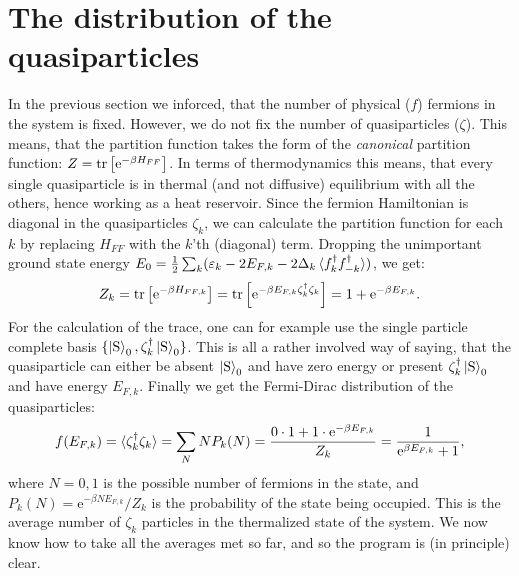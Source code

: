 \section{The distribution of the quasiparticles}
In the previous section we inforced, that the number of physical ($f$) fermions in the system is fixed. However, we do not fix the number of quasiparticles ($\zeta$). This means, that the partition function takes the form of the \textit{canonical} partition function: $Z = \operatorname{tr}\left[\text{e}^{-\beta H_{FF}}\right]$. In terms of thermodynamics this means, that every single quasiparticle is in thermal (and not diffusive) equilibrium with all the others, hence working as a heat reservoir. Since the fermion Hamiltonian is diagonal in the quasiparticles $\zeta_k$, we can calculate the partition function for each $k$ by replacing $H_{FF}$ with the $k$'th (diagonal) term. Dropping the unimportant ground state energy $E_0 = \frac{1}{2}\sum_k (\varepsilon_k-2E_{F,k}-2\Delta_k\braket {f^\dagger_k f^\dagger_{-k}})$, we get:
\begin{equation}
Z_k = \operatorname{tr}\left[\text{e}^{-\beta H_{FF,k}}\right] = \operatorname{tr}\left[\text{e}^{-\beta E_{F,k}\zeta^\dagger_k\zeta_k }\right] = 1 + \text{e}^{-\beta E_{F,k}}. 
\end{equation}     
For the calculation of the trace, one can for example use the single particle complete basis $\{\ket{\text{S}}_0, \zeta^\dagger_k\ket{\text{S}}_0\}$. This is all a rather involved way of saying, that the quasiparticle can either be absent $\ket{\text{S}}_0$ and have zero energy or present $\zeta^\dagger_k\ket{\text{S}}_0$ and have energy $E_{F,k}$. Finally we get the Fermi-Dirac distribution of the quasiparticles:
\begin{equation}
f(E_{F,k}) = \braket {\zeta^\dagger_k\zeta_k} = \sum_N N P_k(N) = \frac{0\cdot 1 + 1 \cdot \text{e}^{-\beta E_{F,k}} }{Z_k} = \frac{1}{\text{e}^{\beta E_{F,k}} + 1}, 
\end{equation}
where $N=0,1$ is the possible number of fermions in the state, and $P_k(N) = \text{e}^{-\beta N E_{F,k}}/Z_k$ is the probability of the state being occupied\cite{PlischkeStatPhys,SchroederThermal}. This is the average number of $\zeta_k$ particles in the thermalized state of the system. We now know how to take all the averages met so far, and so the program is (in principle) clear. 

